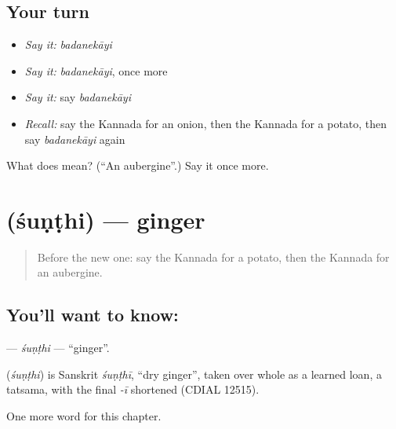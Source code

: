 \subsection*{Your turn}
\begin{itemize}
\raggedright
  \item \emph{Say it:} \emph{badanekāyi}
  \item \emph{Say it:} \emph{badanekāyi}, once more
  \item \emph{Say it:} say \emph{badanekāyi}
  \item \emph{Recall:} say the Kannada for an onion, then the Kannada for a potato, then say \emph{badanekāyi} again
\end{itemize}

\begin{tcolorbox}[breakable,colback=teal!4,colframe=teal!35!black,title={Before you move on}]
What does  mean? (\textquotedblleft{}An aubergine\textquotedblright{}.) Say it once more.
\end{tcolorbox}
\section[\texorpdfstring{\kn{ಶುಂಠಿ} (śuṇṭhi)}{ಶುಂಠಿ (śuṇṭhi)}]{ (śuṇṭhi) — ginger}

\label{lesson:KA-C124-sunthi}



\begin{quote}
Before the new one: say the Kannada for a potato, then the Kannada for an aubergine.
\end{quote}

\subsection*{You'll want to know: }
\textbf{} — \emph{śuṇṭhi} — \textquotedblleft{}ginger\textquotedblright{}.

\begin{cousinweb}
\textbf{} (\emph{śuṇṭhi}) is Sanskrit \emph{śuṇṭhī}, \textquotedblleft{}dry ginger\textquotedblright{}, taken over whole as a learned loan, a tatsama, with the final \emph{-ī} shortened (CDIAL 12515).
\end{cousinweb}

\begin{grammarlens}[title={What you've built}]
One more word for this chapter.
\end{grammarlens}

